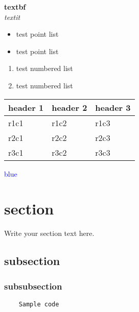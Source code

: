 \documentclass{article}
\begin{document}
\textbf{textbf}\\
\textit{textit}\\

\begin{itemize}
    \item test point list
    \item test point list
\end{itemize}

\begin{enumerate}
    \item test numbered list
    \item test numbered list
\end{enumerate}

\begin{table}[]
\begin{tabular}{lll}
header 1 & header 2 & header 3 \\\hline
r1c1     & r1c2     & r1c3\\
r2c1     & r2c2     & r2c3\\
r3c1     & r3c2     & r3c3\\
\end{tabular}
\end{table}

\textcolor{blue}{blue}

\section{section}
Write your section text here.
\subsection{subsection}
\subsubsection{subsubsection}

\begin{verbatim}
    Sample code
\end{verbatim}

\end{document}
